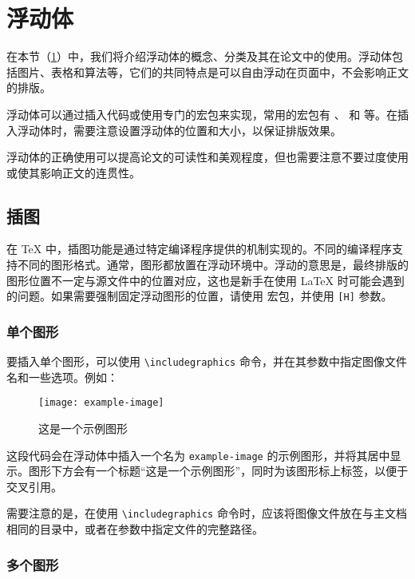 \section{浮动体}\label{sec:float}

在本节（\cref{sec:float}）中，我们将介绍浮动体的概念、分类及其在论文中的使用。浮动体包括图片、表格和算法等，它们的共同特点是可以自由浮动在页面中，不会影响正文的排版。

浮动体可以通过插入代码或使用专门的宏包来实现，常用的宏包有 、 和  等。在插入浮动体时，需要注意设置浮动体的位置和大小，以保证排版效果。

浮动体的正确使用可以提高论文的可读性和美观程度，但也需要注意不要过度使用或使其影响正文的连贯性。

\subsection{插图}

在 \TeX{} 中，插图功能是通过特定编译程序提供的机制实现的。不同的编译程序支持不同的图形格式。通常，图形都放置在浮动环境中。浮动的意思是，最终排版的图形位置不一定与源文件中的位置对应，这也是新手在使用 \LaTeX{} 时可能会遇到的问题。如果需要强制固定浮动图形的位置，请使用  宏包，并使用 \texttt{[H]} 参数。

\subsubsection{单个图形}

要插入单个图形，可以使用 \verb|\includegraphics| 命令，并在其参数中指定图像文件名和一些选项。例如：

\begin{figure}[htbp]
  \centering
  \texttt{[image: example-image]}
  \caption{这是一个示例图形}
  \label{fig:example}
\end{figure}

这段代码会在浮动体中插入一个名为 \verb|example-image| 的示例图形，并将其居中显示。图形下方会有一个标题“这是一个示例图形”，同时为该图形标上标签，以便于交叉引用。

需要注意的是，在使用 \verb|\includegraphics| 命令时，应该将图像文件放在与主文档相同的目录中，或者在参数中指定文件的完整路径。

\subsubsection{多个图形}


